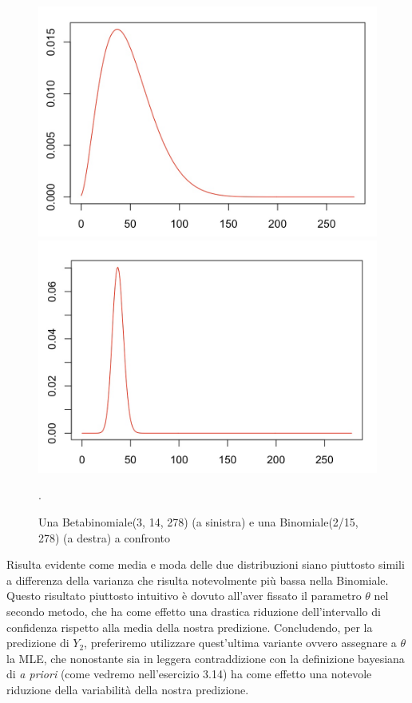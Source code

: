 \begin{figure}[!ht]
\begin{minipage}[b]{0.47\textwidth}
\centering
\includegraphics[width=\textwidth]{img/esercizio3-07-BetaBinomiale}
\end{minipage}
\hfill
\begin{minipage}[b]{0.47\textwidth}
\centering
\includegraphics[width=\textwidth]{img/esercizio3-07-Binomiale}
\end{minipage}
\caption{Una Betabinomiale(3, 14, 278) (a sinistra) e una Binomiale(2/15, 278) (a destra) a confronto}.
\label{fig:Binomiale}
\end{figure}

Risulta evidente come media e moda delle due distribuzioni siano piuttosto simili a differenza della varianza che risulta notevolmente più bassa nella Binomiale. Questo risultato piuttosto intuitivo è dovuto all'aver fissato il parametro $\theta$ nel secondo metodo, che ha come effetto una drastica riduzione dell'intervallo di confidenza rispetto alla media della nostra predizione. Concludendo, per la  predizione di $Y_2$, preferiremo utilizzare quest'ultima variante ovvero assegnare a $\theta$ la MLE, che nonostante sia in leggera contraddizione con la definizione bayesiana di \textit{a priori} (come vedremo nell'esercizio 3.14) ha come effetto una notevole riduzione della variabilità della nostra predizione.